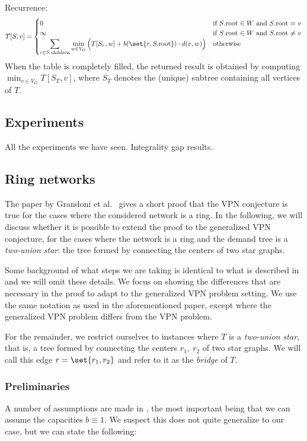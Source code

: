 Recurrence:
\[
    T[S, v] = \begin{cases}
                  0 &\text{if $S$.root $\in W$ and $S$.root = $v$} \\
                  \infty &\text{if $S$.root $\in W$ and $S$.root $\neq$ $v$} \\
                  \displaystyle \sum_{r \in S.\text{children}} \min_{w \in V_G} \Big( T[S_r, w] + b(\set{r, S.\text{root}}) \cdot d(v, w) \Big) &\text{otherwise} \\
    \end{cases}
\]
When the table is completely filled, the returned result is obtained by computing $\min_{v \in V_G} T[S_T, v]$, where $S_T$ denotes the (unique) subtree containing all vertices of $T$.

\subsection{Experiments}
All the experiments we have seen.
Integrality gap results.

\subsection{Ring networks}
The paper by Grandoni et al.~\cite{grandoni2008short} gives a short proof that the VPN conjecture is true for the cases where the considered network is a ring.
In the following, we will discuss whether it is possible to extend the proof to the generalized VPN conjecture, for the cases where the network is a ring and the demand tree is a \emph{two-union star}: the tree formed by connecting the centers of two star graphs.

Some background of what steps we are taking is identical to what is described in \cite{grandoni2008short} and we will omit these details.
We focus on showing the differences that are necessary in the proof to adapt to the generalized VPN problem setting.
We use the same notation as used in the aforementioned paper, except where the generalized VPN problem differs from the VPN problem.

For the remainder, we restrict ourselves to instances where $T$ is a \emph{two-union star}, that is, a tree formed by connecting the centers $r_1,\ r_2$ of two star graphs.
We will call this edge $r = \set{r_1, r_2}$ and refer to it as the \emph{bridge} of $T$.

\subsubsection{Preliminaries}
A number of assumptions are made in \cite{grandoni2008short}, the most important being that we can assume the capacities $b \equiv 1$.
We suspect this does not quite generalize to our case, but we can state the following:


